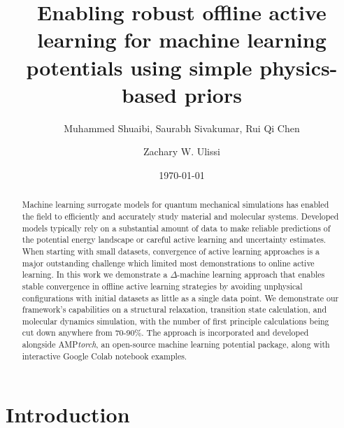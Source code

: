 \documentclass[
 reprint,
 amsmath,
 amssymb,
 aps,
]{revtex4-1}
\begin{document}
\title{Enabling robust offline active learning for machine learning potentials using simple physics-based priors}

\author{Muhammed Shuaibi, Saurabh Sivakumar, Rui Qi Chen}
\author{Zachary W. Ulissi}%
%

\date{\today}

\begin{abstract}
Machine learning surrogate models for quantum mechanical simulations has enabled the field to efficiently and accurately study material and molecular systems. Developed models typically rely on a substantial amount of data to make reliable predictions of the potential energy landscape or careful active learning and uncertainty estimates. When starting with small datasets, convergence of active learning approaches is a major outstanding challenge which limited most demonstrations to online active learning. In this work we demonstrate a $\Delta$-machine learning approach that enables stable convergence in offline active learning strategies by avoiding unphysical configurations with initial datasets as little as a single data point.  We demonstrate our framework's capabilities on a structural relaxation, transition state calculation, and molecular dynamics simulation,  with the number of first principle calculations being cut down anywhere from 70-90\%.  The approach is incorporated and developed alongside AMP\textit{torch}, an open-source machine learning potential package, along with interactive Google Colab notebook examples.  
\end{abstract}

\maketitle

\section{Introduction}
\end{document}
